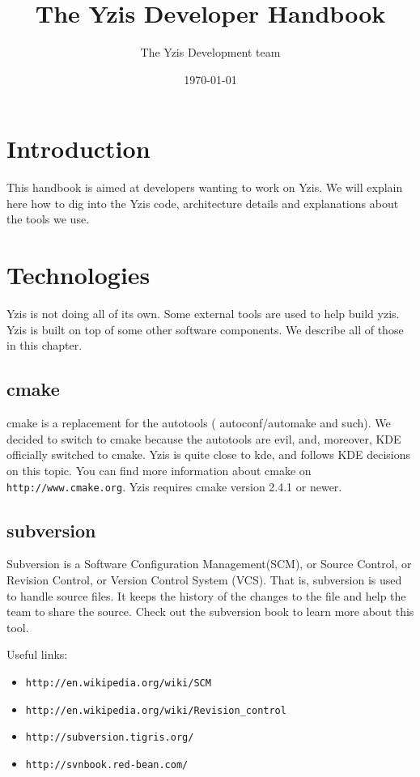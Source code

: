\documentclass[a4paper,12pt]{report}
\title{The Yzis Developer Handbook}
\date{\today}
\author{The Yzis Development team}
\begin{document}
\maketitle
\tableofcontents

% 


\chapter{Introduction}

This handbook is aimed at developers wanting to work on Yzis. We will
explain here how to dig into the Yzis code, architecture details and
explanations about the tools we use.


\chapter{Technologies}
Yzis is not doing all of its own. Some external tools are used to help
build yzis. Yzis is built on top of some other software components. We describe
all of those in this chapter.

\section{cmake}
cmake is a replacement for the autotools ( autoconf/automake and such). We
decided to switch to cmake because the autotools are evil, and, moreover,
KDE officially switched to cmake. Yzis is quite close to kde, and follows
KDE decisions on this topic.
You can find more information about cmake on \texttt{http://www.cmake.org}.
Yzis requires cmake version 2.4.1 or newer.

\section{subversion}
Subversion is a Software Configuration Management(SCM), or Source Control,
or Revision Control, or Version Control System (VCS). That is, subversion
is used to handle source files. It keeps the history of the changes to the
file and help the team to share the source.
Check out the subversion book to learn more about this tool.

Useful links:
\begin{itemize}
\item \texttt{http://en.wikipedia.org/wiki/SCM}
\item \texttt{http://en.wikipedia.org/wiki/Revision\_control}
\item \texttt{http://subversion.tigris.org/}
\item \texttt{http://svnbook.red-bean.com/}
\end{itemize}
\end{document}
